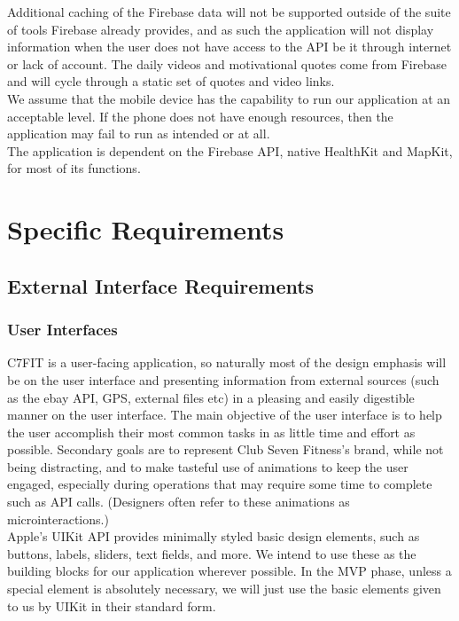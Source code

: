 \documentclass[letterpaper,10pt,titlepage]{article}
\begin{document}
Additional caching of the Firebase data will not be supported outside of the suite of tools Firebase already provides, and as such the application will not display information when the user does not have access to the API be it through internet or lack of account. The daily videos and motivational quotes come from Firebase and will cycle through a static set of quotes and video links.\\

We assume that the mobile device has the capability to run our application at an acceptable level. If the phone does not have enough resources, then the application may fail to run as intended or at all.\\

The application is dependent on the Firebase API, native HealthKit and MapKit, for most of its functions.\\

\section{Specific Requirements}

\subsection{External Interface Requirements}

\subsubsection{User Interfaces}

C7FIT is a user-facing application, so naturally most of the design emphasis will be on the user interface and presenting information from external sources (such as the ebay API, GPS, external files etc) in a pleasing and easily digestible manner on the user interface. The main objective of the user interface is to help the user accomplish their most common tasks in as little time and effort as possible. Secondary goals are to represent Club Seven Fitness’s brand, while not being distracting, and to make tasteful use of animations to keep the user engaged, especially during operations that may require some time to complete such as API calls. (Designers often refer to these animations as microinteractions.)\\


Apple’s UIKit API provides minimally styled basic design elements, such as buttons, labels, sliders, text fields, and more. We intend to use these as the building blocks for our application wherever possible. In the MVP phase, unless a special element is absolutely necessary, we will just use the basic elements given to us by UIKit in their standard form.\\
\end{document}
